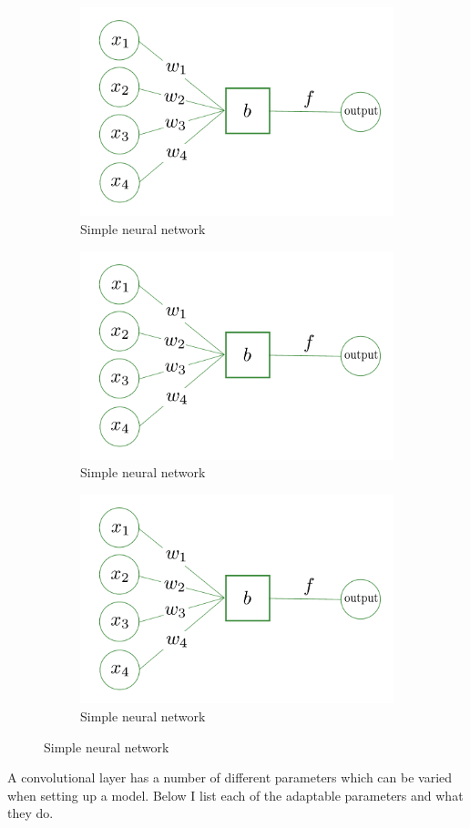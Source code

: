 \begin{figure}[h]
\begin{subfigure}[h]{\columnwidth}
    \centering
    \includegraphics[width=0.5\columnwidth]{C3_cnn/neuron.pdf}
    \caption{Simple neural network}
    \label{machine:cnn:convlayer:input}
\end{subfigure}   

\begin{subfigure}[h]{\columnwidth}
    \includegraphics[width=0.5\columnwidth]{C3_cnn/neuron.pdf}
    \caption{Simple neural network}
    \label{machine:cnn:convlayer:nn}
\end{subfigure} 

\begin{subfigure}[h]{\columnwidth}
    \includegraphics[width=0.5\columnwidth]{C3_cnn/neuron.pdf}
    \caption{Simple neural network}
    \label{machine:nn:convlayer:cnn}
\end{subfigure} 

\end{figure}

A convolutional layer has a number of different parameters which can be varied when setting up a model.
Below I list each of the adaptable parameters and what they do.

